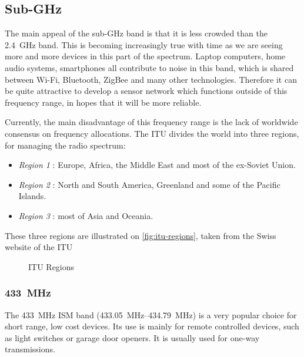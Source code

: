 \subsection{Sub-GHz}

The main appeal of the sub-GHz band is that it is less crowded than the
\SI{2.4}{GHz} band. This is becoming increasingly true with time as we are
seeing more and more devices in this part of the spectrum. Laptop computers,
home audio systems, smartphones all contribute to noise in this band, which is
shared between Wi-Fi, Bluetooth, ZigBee and many other technologies. Therefore
it can be quite attractive to develop a sensor network which functions outside
of this frequency range, in hopes that it will be more reliable.

Currently, the main disadvantage of this frequency range is the lack of
worldwide consensus on frequency allocations. The \ac{ITU} divides the world
into three regions, for managing the radio spectrum:

\begin{itemize}
  \item \emph{Region 1} : Europe, Africa, the Middle East and most of the
    ex-Soviet Union.
  \item \emph{Region 2} : North and South America, Greenland and some of the
    Pacific Islands.
  \item \emph{Region 3} : most of Asia and Oceania.
\end{itemize}

These three regions are illustrated on \autoref{fig:itu-regions}, taken from the
Swiss website of the \ac{ITU}

\begin{figure}[htb]
  \begin{center}
  \end{center}
  \caption{ITU Regions}
  \label{fig:itu-regions}
\end{figure}

\subsubsection{\SI{433}{MHz}}

The \SI{433}{MHz} ISM band (\SIrange{433.05}{434.79}{MHz})
 is a very popular choice for short range,
low cost devices. Its use is mainly for remote controlled devices, such as light
switches or garage door openers. It is usually used for one-way transmissions.


